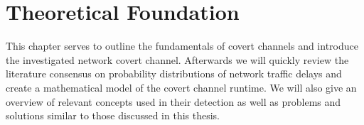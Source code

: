 \documentclass[12pt,a4paper,automark, toc=bib]{scrreprt}
\theoremstyle{definition}
\begin{document}

	
	\chapter{Theoretical Foundation}
		This chapter serves to outline the fundamentals of covert channels and introduce the investigated network covert channel. Afterwards we will quickly review the literature consensus on probability distributions of network traffic delays and create a mathematical model of the covert channel runtime. We will also give an overview of relevant concepts used in their detection as well as problems and solutions similar to those discussed in this thesis.
		
\end{document}
